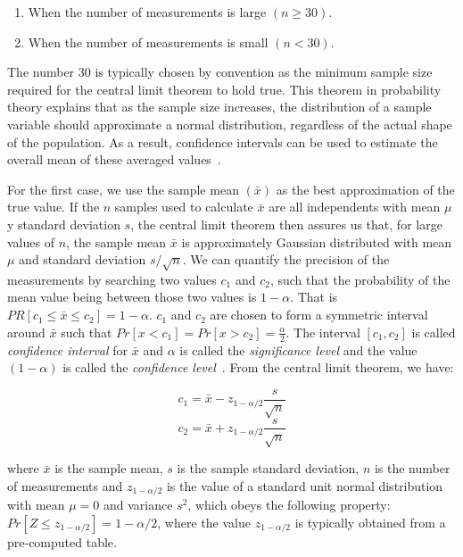 \begin{enumerate}
\item When the number of measurements is large \((n \ge 30)\).
\item When the number of measurements is small \((n < 30)\).
\end{enumerate}

The number 30 is typically chosen by convention as the minimum sample size required for the central limit theorem to hold true. This theorem in probability theory explains that as the sample size increases, the distribution of a sample variable should approximate a normal distribution, regardless of the actual shape of the population. As a result, confidence intervals can be used to estimate the overall mean of these averaged values~\cite{DBLP_conf_oopsla_GeorgesBE07,lilja2005measuring}.

For the first case, we use the sample mean \((\bar{x})\) as the best approximation of the true value. If the \(n\) samples used to calculate \(\bar{x}\) are all independents with mean \(\mu\) y standard deviation \(s\), the central limit theorem then assures us that, for large values of \(n\), the sample mean \(\bar{x}\) is approximately Gaussian distributed with mean \(\mu\) and standard deviation \(s / \sqrt{n}\). We can quantify the precision of the measurements by searching two values \(c_1\) and \(c_2\), such that the probability of the mean value being between those two values is \(1 - \alpha\). That is \(PR[c_1 \le \bar{x} \le c_2] = 1 - \alpha\). \(c_1\) and \(c_2\) are chosen to form a symmetric interval around \(\bar{x}\) such that \(Pr[x < c_1] = Pr[x > c_2] = \frac{\alpha}{2}\). The interval \([c_1, c_2]\) is called \textit{confidence interval} for \(\bar{x}\) and \(\alpha\) is called the \textit{significance level} and the value \((1 - \alpha)\) is called the \textit{confidence level}~\cite{DBLP_conf_oopsla_GeorgesBE07,lilja2005measuring}. From the central limit theorem, we have:

\begin{equation}
c_1 = \bar{x} - z_{1 - \alpha/2}\frac{s}{\sqrt{n}}
\end{equation}
\begin{equation}
c_2 = \bar{x} + z_{1 - \alpha/2}\frac{s}{\sqrt{n}}
\end{equation}

where \(\bar{x}\) is the sample mean, \(s\) is the sample standard deviation,
\(n\) is the number of measurements and \(z_{1 - \alpha/2}\) is the value of
a standard unit normal distribution with mean \(\mu = 0\) and variance
\(s^2\), which obeys the following property: \(Pr[Z \le z_{1-\alpha/2}] =
   1 - \alpha/2\), where the value \(z_{1 - \alpha/2}\) is typically obtained
from a pre-computed table.

